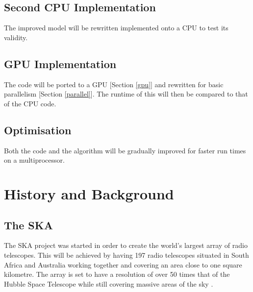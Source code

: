 \subsection{Second CPU Implementation}
The improved model will be rewritten implemented onto a CPU to test its validity.
\subsection{GPU Implementation}
The code will be ported to a GPU [Section \ref{gpu}] and rewritten for basic parallelism [Section \ref{parallel}]. The runtime of this will then be compared to that of the CPU code.
\subsection{Optimisation}
Both the code and the algorithm will be gradually improved for faster run times on a multiprocessor.
\newpage
\section{History and Background}
\subsection{The SKA}\label{ska}
The SKA project was started in order to create the world's largest array of radio telescopes. This will be achieved by having 197 radio telescopes situated in South Africa and Australia working together and covering an area close to one square kilometre. The array is set to have a resolution of over 50 times that of the Hubble Space Telescope while still covering massive areas of the sky \cite{SKAsite}.
